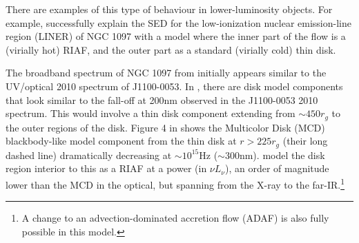 \documentclass[a4paper,fleqn,usenatbib]{mnras}
\begin{document}
There are examples of this type of behaviour in lower-luminosity
objects.  For example, \citet{Nemmen2006} successfully explain the SED
for the low-ionization nuclear emission-line region (LINER) of NGC
1097 with a model where the inner part of the flow is a (virially hot)
RIAF, and the outer part as a standard (virially cold) thin disk.

The broadband spectrum of NGC 1097 from \citet{Nemmen2006} initially
appears similar to the UV/optical 2010 spectrum of J1100-0053.  In
\citet[][e.g., their Figure 4]{Nemmen2006}, there are disk model
components that look similar to the fall-off at 200nm observed in the
J1100-0053 2010 spectrum. This would involve a thin disk component
extending from $\sim 450r_{g}$ to the outer regions of the
disk. Figure 4 in \citet{Nemmen2006} shows the Multicolor Disk (MCD)
blackbody-like model component from the thin disk at $r>225r_{g}$
(their long dashed line) dramatically decreasing at $\sim 10^{15}$Hz
($\sim 300$nm). \citet{Nemmen2006} model the disk region interior to
this as a RIAF at a power (in $\nu L_{\nu}$), an order of magnitude
lower than the MCD in the optical, but spanning from the X-ray to the
far-IR.\footnote{A change to an advection-dominated accretion flow
(ADAF) is also fully possible in this model.}
\end{document}
